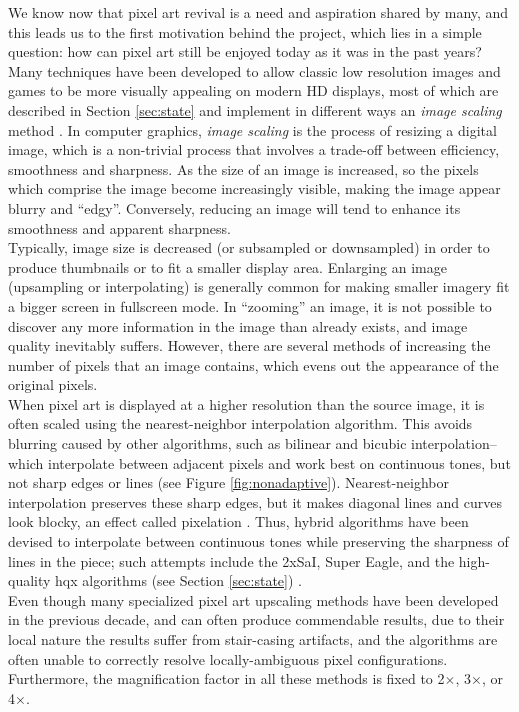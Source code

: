 \documentclass[]{usiinfbachelorproject}
\begin{document}
We know now that pixel art revival is a need and aspiration shared by many, and this leads us to the first motivation behind the project, which lies in a simple question: how can pixel art still be enjoyed today as it was in the past years? \\
Many techniques have been developed to allow classic low resolution images and games to be more visually appealing on modern HD displays, most of which are described in Section \ref{sec:state} and implement in different ways an \emph{image scaling} method \cite{Wiki:scaling}. In computer graphics, \emph{image scaling} is the process of resizing a digital image, which is a non-trivial process that involves a trade-off between efficiency, smoothness and sharpness. As the size of an image is increased, so the pixels which comprise the image become increasingly visible, making the image appear blurry and ``edgy''. Conversely, reducing an image will tend to enhance its smoothness and apparent sharpness.\\
Typically, image size is decreased (or subsampled or downsampled) in order to produce thumbnails or to fit a smaller display area. Enlarging an image (upsampling or interpolating) is generally common for making smaller imagery fit a bigger screen in fullscreen mode. In ``zooming'' an image, it is not possible to discover any more information in the image than already exists, and image quality inevitably suffers. However, there are several methods of increasing the number of pixels that an image contains, which evens out the appearance of the original pixels.\\
When pixel art is displayed at a higher resolution than the source image, it is often scaled using the nearest-neighbor interpolation algorithm. This avoids blurring caused by other algorithms, such as bilinear and bicubic interpolation--which interpolate between adjacent pixels and work best on continuous tones, but not sharp edges or lines (see Figure \ref{fig:nonadaptive}). Nearest-neighbor interpolation preserves these sharp edges, but it makes diagonal lines and curves look blocky, an effect called pixelation \cite{Wiki:scaling}. Thus, hybrid algorithms have been devised to interpolate between continuous tones while preserving the sharpness of lines in the piece; such attempts include the 2xSaI, Super Eagle, and the high-quality hqx algorithms (see Section \ref{sec:state}) \cite{Wiki:pixelart}.\\
Even though many specialized pixel art upscaling methods have been developed in the previous decade, and can often produce commendable results, due to their local nature the results suffer from stair-casing artifacts, and the algorithms are often unable to correctly resolve locally-ambiguous pixel configurations. Furthermore, the magnification factor in all these methods is fixed to 2$\times$, 3$\times$, or 4$\times$.\\
\end{document}
